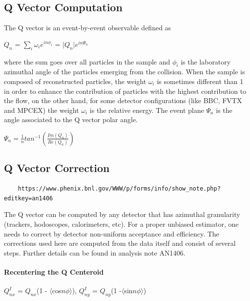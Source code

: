 \documentclass{article}
\begin{document}
\subsection{Q Vector Computation}
\label{subsection:Q Vector Computation}
The Q vector is an event-by-event observable defined as
\begin{center}
\large
$Q_{n}$ = $\sum_{i} \omega_{i} e^{in\phi_{i}}$ = $\vert Q_{n} \vert e^{in\Psi_{n}}$
\end{center}
where the sum goes over all particles in the sample and $\phi_{i}$ is the laboratory azimuthal angle of the particles emerging from the collision.
\newline
When the sample is composed of reconstructed particles, the weight $\omega_{i}$ is sometimes different than 1 in order to enhance 
the contribution of particles with the highest contribution to the flow, on the other hand, for some detector configurations 
(like BBC, FVTX and MPCEX) the weight $\omega_{i}$ is the relative energy.
\newline
The event plane $\Psi_{n}$ is the angle associated to the Q vector polar angle.
\begin{center}
\large
$\Psi_{n} = \frac{1}{n} tan^{-1}( \frac{Im(Q_{n})}{Re(Q_{n})} )$
\end{center}
\subsection{Q Vector Correction}
\begin{verbatim}
    https://www.phenix.bnl.gov/WWW/p/forms/info/show_note.php?editkey=an1406
\end{verbatim}
\label{subsection:Q Vector Correction}
The Q vector can be computed by any detector that has azimuthal granularity (trackers, hodoscopes, calorimeters, etc).
For a proper unbiased estimator, one needs to correct by detector non-uniform acceptance and efficiency.
The corrections used here are computed from the data itself and consist of several steps.
Further details can be found in analysis note AN1406.

\paragraph{Recentering the \textbf{Q} Centeroid}
\label{paragraph:Recentering the Q Centeroid}
\begin{center}
\large
$Q_{nx}^{I}$ = $Q_{nx}$(1 - $\langle$cos$n\phi$$\rangle$),   $Q_{ny}^{I}$ = $Q_{ny}$(1 -$\langle$sin$n\phi$$\rangle$)
\end{center}
\end{document}
